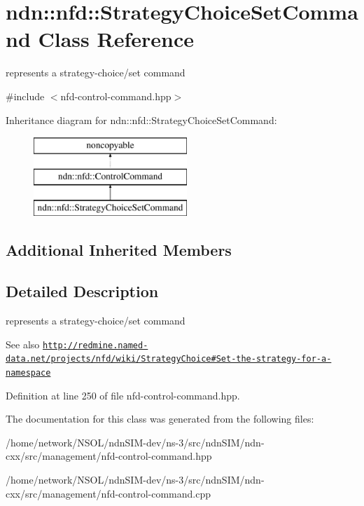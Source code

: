 \hypertarget{classndn_1_1nfd_1_1StrategyChoiceSetCommand}{}\section{ndn\+:\+:nfd\+:\+:Strategy\+Choice\+Set\+Command Class Reference}
\label{classndn_1_1nfd_1_1StrategyChoiceSetCommand}


represents a strategy-\/choice/set command  




{\ttfamily \#include $<$nfd-\/control-\/command.\+hpp$>$}

Inheritance diagram for ndn\+:\+:nfd\+:\+:Strategy\+Choice\+Set\+Command\+:\begin{figure}[H]
\begin{center}
\leavevmode
\includegraphics[height=3.000000cm]{classndn_1_1nfd_1_1StrategyChoiceSetCommand}
\end{center}
\end{figure}
\subsection*{Additional Inherited Members}


\subsection{Detailed Description}
represents a strategy-\/choice/set command 

\begin{DoxySeeAlso}{See also}
\href{http://redmine.named-data.net/projects/nfd/wiki/StrategyChoice#Set-the-strategy-for-a-namespace}{\tt http\+://redmine.\+named-\/data.\+net/projects/nfd/wiki/\+Strategy\+Choice\#\+Set-\/the-\/strategy-\/for-\/a-\/namespace} 
\end{DoxySeeAlso}


Definition at line 250 of file nfd-\/control-\/command.\+hpp.



The documentation for this class was generated from the following files\+:\begin{DoxyCompactItemize}
\item 
/home/network/\+N\+S\+O\+L/ndn\+S\+I\+M-\/dev/ns-\/3/src/ndn\+S\+I\+M/ndn-\/cxx/src/management/nfd-\/control-\/command.\+hpp\item 
/home/network/\+N\+S\+O\+L/ndn\+S\+I\+M-\/dev/ns-\/3/src/ndn\+S\+I\+M/ndn-\/cxx/src/management/nfd-\/control-\/command.\+cpp\end{DoxyCompactItemize}
